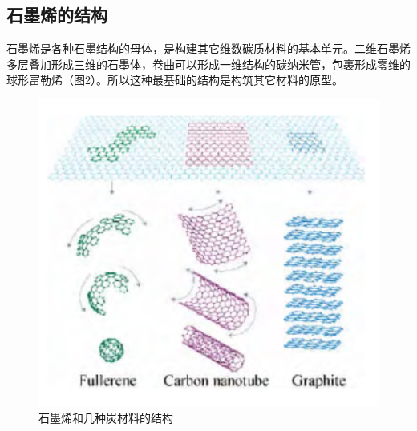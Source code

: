 \subsection{石墨烯的结构}
石墨烯是各种石墨结构的母体，是构建其它维数碳质材料的基本单元。二维石墨烯多层叠加形成三维的石墨体，卷曲可以形成一维结构的碳纳米管，包裹形成零维的球形富勒烯（图2）。所以这种最基础的结构是构筑其它材料的原型。\par
\begin{figure}[H]
    \centering
    \includegraphics{img/石墨烯和几种炭材料的结构.png}
    \caption{石墨烯和几种炭材料的结构}
    \label{fig:my_label}
\end{figure}


